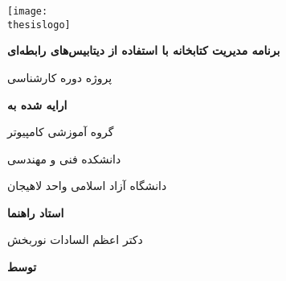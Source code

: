 \newcommand{\firstsize}{\normalsize}
\newcommand{\secondsize}{\large}
\newcommand{\thirdsize}{\Large}
\newcommand{\fourthsize}{\LARGE}

\newcommand{\inlinewidth}{1.0mm}
\newcommand{\outlinewidth}{7.0mm}

\newcommand{\thesislogo}{figs/logo.png}
\newcommand{\thesistitle}{برنامه مدیریت کتابخانه با استفاده از دیتابیس‌های رابطه‌ای}
\newcommand{\thesisgroup}{گروه آموزشی کامپیوتر}
\newcommand{\thesisguide}{دکتر اعظم السادات نوربخش}
\newcommand{\thesisauthor}{حسین اسمعیل‌زاده کومله}
\newcommand{\thesisauthorid}{202982358223}
\newcommand{\thesislesson}{پروژه نرم‌افزار}
\newcommand{\thesisdate}{۱۶ دی ۱۴۰۲}

\begin{titlepage}
	\centering
	\texttt{[image: \\thesislogo]}\par\vspace{1cm}
	{\fourthsize\bfseries\titlefont\thesistitle\par}
		\vspace{\outlinewidth}
		\vspace{\inlinewidth}
	{\thirdsize پروژه دوره کارشناسی\par}
		\vspace{\outlinewidth}
		\vspace{\inlinewidth}
	{\secondsize\bfseries\titlefont ارایه شده به\par}
		\vspace{\inlinewidth}
	{\secondsize\thesisgroup\par}
		\vspace{\inlinewidth}
	{\secondsize دانشکده فنی و مهندسی \par}
		\vspace{\inlinewidth}
	{دانشگاه آزاد اسلامی واحد لاهیجان\par}
		\vspace{\inlinewidth}
		\vspace{\outlinewidth}
	{\thirdsize\bfseries\titlefont استاد راهنما\par}
		\vspace{\inlinewidth}
	{\secondsize\thesisguide\par}
		\vspace{\inlinewidth}
		\vspace{\outlinewidth}
	{\thirdsize\titlefont\bfseries توسط\par}
		\vspace{\inlinewidth}

\end{titlepage}
